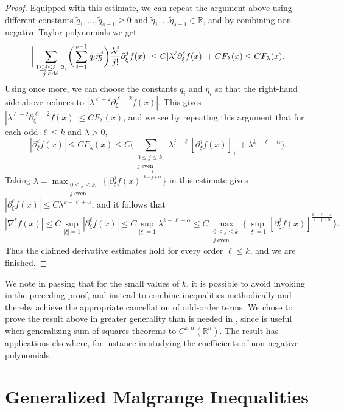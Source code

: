 \documentclass[oneside,hidelinks,indentfirst,10pt]{book}
\begin{document}
\begin{proof}
Equipped with this estimate, we can repeat the argument above using different constants \(\tilde{q}_1,\dots,\tilde{q}_{s-1}\geq 0\) and \(\tilde{\eta}_1,\dots\tilde{\eta}_{s-1}\in\mathbb{R}\), and by combining non-negative Taylor polynomials we get
\[
    \bigg|\sum_{\substack{1\leq j\leq \ell-2,\\ j\;\textrm{odd}}}\bigg(\sum_{i=1}^{s-1}\tilde{q}_i\tilde{\eta}_i^j\bigg)\frac{\lambda^j}{j!}\partial^j_\xi f(x)\bigg|\leq C|\lambda^\ell\partial^\ell_\xi f(x)|+CF_\lambda(x)\leq CF_\lambda(x).\\
\]
Using  once more, we can choose the constants \(\tilde{q}_i\) and \(\tilde{\eta}_i\) so that the right-hand side above reduces to \(|\lambda^{\ell-2}\partial^{\ell-2}_\xi f(x)|\). This gives \(|\lambda^{\ell-2}\partial^{\ell-2}_\xi f(x)|\leq CF_\lambda(x)\), and we see by repeating this argument that for each odd \(\ell\leq k\) and \(\lambda>0\),
\[
    |\partial_\xi^\ell f(x)|\leq  CF_\lambda(x)\leq  C\bigg(\sum_{\substack{0\leq j\leq k,\\ j\;\textrm{even}}}\lambda^{j-\ell}[\partial^j_\xi f(x)]_++\lambda^{k-\ell+\alpha}\bigg).
\]
Taking \(\lambda=\displaystyle\max_{\substack{0\leq j\leq k,\\ j\;\textrm{even}}}\{|\partial_\xi^jf(x)|^\frac{1}{k-j+\alpha}\}\) in this estimate gives \(|\partial_\xi^\ell f(x)|\leq C\lambda^{k-\ell+\alpha}\), and it follows that
\[
    |\nabla^\ell f(x)|\leq C\sup_{|\xi|=1}|\partial^\ell_\xi f(x)|\leq C\sup_{|\xi|=1}\lambda^{k-\ell+\alpha}\leq C\max_{\substack{0\leq j\leq k\\j\;\mathrm{even}}}\bigg\{\sup_{|\xi|=1}[\partial^j_\xi f(x)]_+^\frac{k-\ell+\alpha}{k-j+\alpha}\bigg\}.
\]
Thus the claimed derivative estimates hold for every order \(\ell\leq k\), and we are finished.
\end{proof}


We note in passing that for the small values of \(k\), it is possible to avoid invoking  in the preceding proof, and instead to combine inequalities methodically and thereby achieve the appropriate cancellation of odd-order terms. We chose to prove the result above in greater generality than is needed in , since  is useful when generalizing sum of squares theorems to \(C^{k,\alpha}(\mathbb{R}^n)\). The result has applications elsewhere, for instance in studying the coefficients of non-negative polynomials.


\section{Generalized Malgrange Inequalities}\label{sec:malg}
\end{document}

